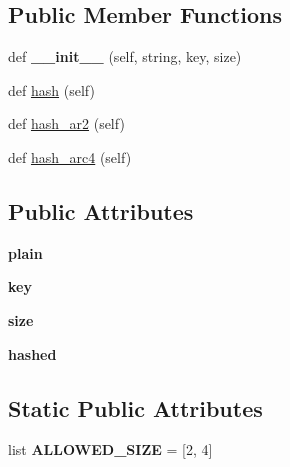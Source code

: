 \subsection*{Public Member Functions}
\begin{DoxyCompactItemize}
\item 
def {\bfseries \+\_\+\+\_\+init\+\_\+\+\_\+} (self, string, key, size)\hypertarget{classhal_1_1maths_1_1crypt_1_1_a_r_c_a82309db9054f68f3f2c9b5eea7e46c3d}{}\label{classhal_1_1maths_1_1crypt_1_1_a_r_c_a82309db9054f68f3f2c9b5eea7e46c3d}

\item 
def \hyperlink{classhal_1_1maths_1_1crypt_1_1_a_r_c_a5453d043fc6d569e8d56b08d0657440d}{hash} (self)
\item 
def \hyperlink{classhal_1_1maths_1_1crypt_1_1_a_r_c_a8bb650cb7e154c93c8d3f90939e42330}{hash\+\_\+ar2} (self)
\item 
def \hyperlink{classhal_1_1maths_1_1crypt_1_1_a_r_c_ad81bf4a4f683f4c303c05c6ae93fb020}{hash\+\_\+arc4} (self)
\end{DoxyCompactItemize}
\subsection*{Public Attributes}
\begin{DoxyCompactItemize}
\item 
{\bfseries plain}\hypertarget{classhal_1_1maths_1_1crypt_1_1_a_r_c_ab565094fdb53f56635001d60863153c7}{}\label{classhal_1_1maths_1_1crypt_1_1_a_r_c_ab565094fdb53f56635001d60863153c7}

\item 
{\bfseries key}\hypertarget{classhal_1_1maths_1_1crypt_1_1_a_r_c_a21a38c518574b0558238889bc0632e24}{}\label{classhal_1_1maths_1_1crypt_1_1_a_r_c_a21a38c518574b0558238889bc0632e24}

\item 
{\bfseries size}\hypertarget{classhal_1_1maths_1_1crypt_1_1_a_r_c_a87c67dc38f9fd683d3f16f5b27a125a3}{}\label{classhal_1_1maths_1_1crypt_1_1_a_r_c_a87c67dc38f9fd683d3f16f5b27a125a3}

\item 
{\bfseries hashed}\hypertarget{classhal_1_1maths_1_1crypt_1_1_a_r_c_ad6d70770753dd95fd685f11aa2c50f35}{}\label{classhal_1_1maths_1_1crypt_1_1_a_r_c_ad6d70770753dd95fd685f11aa2c50f35}

\end{DoxyCompactItemize}
\subsection*{Static Public Attributes}
\begin{DoxyCompactItemize}
\item 
list {\bfseries A\+L\+L\+O\+W\+E\+D\+\_\+\+S\+I\+ZE} = \mbox{[}2, 4\mbox{]}\hypertarget{classhal_1_1maths_1_1crypt_1_1_a_r_c_add5e33fd8bbab7761bc77f633363c5a0}{}\label{classhal_1_1maths_1_1crypt_1_1_a_r_c_add5e33fd8bbab7761bc77f633363c5a0}

\end{DoxyCompactItemize}


